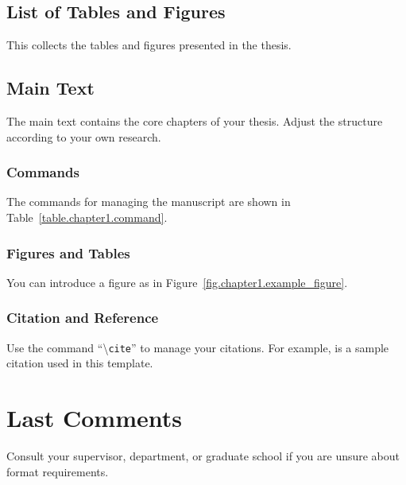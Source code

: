 \subsection{List of Tables and Figures}
This collects the tables and figures presented in the thesis.

\subsection{Main Text}
The main text contains the core chapters of your thesis. Adjust the structure according to your own research.

\subsubsection{Commands}
The commands for managing the manuscript are shown in Table~\ref{table.chapter1.command}.


\subsubsection{Figures and Tables}
You can introduce a figure as in Figure~\ref{fig.chapter1.example_figure}.


\subsubsection{Citation and Reference}
Use the command ``\textbackslash\texttt{cite}'' to manage your citations.
For example, \cite{lamport1994latex} is a sample citation used in this template.

\section{Last Comments}
Consult your supervisor, department, or graduate school if you are unsure about format requirements.
